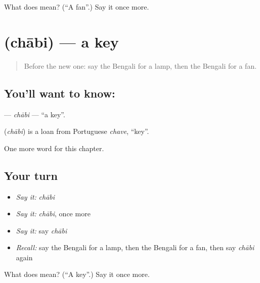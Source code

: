 \begin{tcolorbox}[breakable,colback=teal!4,colframe=teal!35!black,title={Before you move on}]
What does  mean? (\textquotedblleft{}A fan\textquotedblright{}.) Say it once more.
\end{tcolorbox}
\section[\texorpdfstring{\bn{চাবি} (chābi)}{চাবি (chābi)}]{ (chābi) — a key}

\label{lesson:BN-C62-chabi}



\begin{quote}
Before the new one: say the Bengali for a lamp, then the Bengali for a fan.
\end{quote}

\subsection*{You'll want to know: }
\textbf{} — \emph{chābi} — \textquotedblleft{}a key\textquotedblright{}.

\begin{cousinweb}
\textbf{} (\emph{chābi}) is a loan from Portuguese \emph{chave}, \textquotedblleft{}key\textquotedblright{}.
\end{cousinweb}

\begin{grammarlens}[title={What you've built}]
One more word for this chapter.
\end{grammarlens}

\subsection*{Your turn}
\begin{itemize}
\raggedright
  \item \emph{Say it:} \emph{chābi}
  \item \emph{Say it:} \emph{chābi}, once more
  \item \emph{Say it:} say \emph{chābi}
  \item \emph{Recall:} say the Bengali for a lamp, then the Bengali for a fan, then say \emph{chābi} again
\end{itemize}

\begin{tcolorbox}[breakable,colback=teal!4,colframe=teal!35!black,title={Before you move on}]
What does  mean? (\textquotedblleft{}A key\textquotedblright{}.) Say it once more.
\end{tcolorbox}
